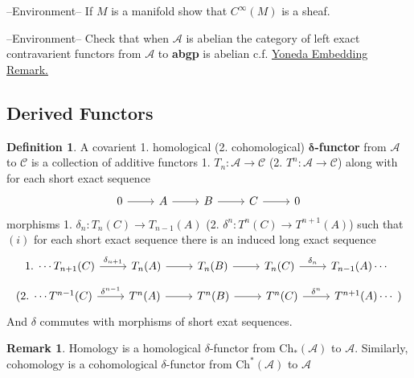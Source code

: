 \documentclass[11pt]{article}
\theoremstyle{definition}
\newtheorem{defn}{Definition}
\newtheorem*{rmk}{Remark}
\begin{document}
    --Environment-- If \(M\) is a manifold show that \(C^\infty(M)\) is a sheaf.

    --Environment-- Check that when \(\mathcal{A}\) is abelian the category of left exact contravarient functors from \(\mathcal{A}\) to \textbf{abgp} is abelian c.f. \hyperref[yoneda rmk]{Yoneda  Embedding Remark.}

    \subsection{Derived Functors}

    \begin{defn}
        A covarient 1. homological (2. cohomological) \(\mathbf{\delta}\)\textbf{-functor} from \(\mathcal{A}\) to \(\mathcal{C}\) is a collection of additive functors 1. \(T_n: \mathcal{A} \to \mathcal{C}\) (2. \(T^n: \mathcal{A} \to \mathcal{C}\)) along with for each short exact sequence
        \begin{equation*}
            \begin{tikzcd}
                0 \arrow[r,"{}"]& A \arrow[r,"{}"] &B \arrow[r,"{}"] &C \arrow[r,"{}"] & 0
            \end{tikzcd}
        \end{equation*}
        morphisms 1. \(\delta_n: T_n(C) \to T_{n-1}(A)\) (2. \(\delta^n: T^n(C) \to T^{n+1}(A)\)) such that \((i)\) for each short exact sequence there is an induced long exact sequence 
        \begin{equation*}
            1.
            \begin{tikzcd}
                \cdots T_{n+1}(C) \arrow[r,"{\delta_{n+1}}"] &T_n(A) \arrow[r,"{}"] &T_n(B) \arrow[r,"{}"] &T_n(C) \arrow[r,"{\delta_n}"] &T_{n-1}(A)\cdots
            \end{tikzcd}
        \end{equation*}
        \begin{equation*}
            (2.
            \begin{tikzcd}
                \cdots T^{n-1}(C) \arrow[r,"{\delta^{n-1}}"] &T^n(A) \arrow[r,"{}"] &T^n(B) \arrow[r,"{}"] &T^n(C) \arrow[r,"{\delta^n}"] &T^{n+1}(A)\cdots
            \end{tikzcd})
        \end{equation*}
        And \(\delta\) commutes with morphisms of short exat sequences.
    \end{defn}
    \begin{rmk}
        Homology is a homological \(\delta\)-functor from \(\text{Ch}_*(\mathcal{A})\) to \(\mathcal{A}\). Similarly, cohomology is a cohomological \(\delta\)-functor from \(\text{Ch}^*(\mathcal{A})\) to \(\mathcal{A}\)
    \end{rmk}
\end{document}

